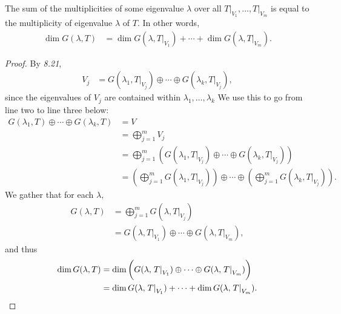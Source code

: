 \documentclass{amsart}
\newcommand{\restrict}[2]{\left.#1\right|_{#2}}
\begin{document}
\begin{claim*}
The sum of the multiplicities of some eigenvalue $\lambda$ over all
$\restrict{T}{V_1},\dots,\restrict{T}{V_m}$ is equal to the
multiplicity of eigenvalue $\lambda$ of $T.$ In other words,
\begin{align*}
    \dim G(\lambda,T)
            &= \dim G(\lambda,\restrict{T}{V_1})
            +\cdots+
            \dim G(\lambda,\restrict{T}{V_m}).
\end{align*}

\end{claim*}
\begin{proof}
By \textit{8.21},
\begin{align*}
    V_j &= G(\lambda_1,\restrict{T}{V_j})\oplus\cdots\oplus G(\lambda_k,
    \restrict{T}{V_j}),
\end{align*}
since the eigenvalues of $V_j$ are contained within
$\lambda_1,\dots,\lambda_k$ We use this to go from line
two to line three below:
\begin{align*}
    G(\lambda_1,T)\oplus\cdots\oplus G(\lambda_k,T)
      &= V \\
      &= \bigoplus_{j=1}^m{V_j} \\
      &= \bigoplus_{j=1}^m{\left(
          G(\lambda_1,\restrict{T}{V_j})\oplus\cdots\oplus G(\lambda_k,
    \restrict{T}{V_j})\right)} \\
      &= \left(\bigoplus_{j=1}^{m}G(\lambda_1,\restrict{T}{V_j})\right)
      \oplus\cdots\oplus
      \left(\bigoplus_{j=1}^{m}G(\lambda_k,\restrict{T}{V_j})\right).
\end{align*}
We gather that for each $\lambda,$
\begin{align*}
    G(\lambda,T) &= \bigoplus_{j=1}^m G(\lambda,\restrict{T}{V_j}) \\
                   &= G(\lambda,\restrict{T}{V_1})\oplus
                   \cdots\oplus G(\lambda,\restrict{T}{V_m}),
\end{align*}
and thus
\begin{align*}
    \dim G(\lambda,T) &= \dim\bigg(
        G(\lambda,\restrict{T}{V_1})
        \oplus\cdots\oplus G(\lambda,\restrict{T}{V_m})
    \bigg)\\
                        &= \dim G(\lambda,\restrict{T}{V_1})
                        +\cdots+
                        \dim G(\lambda,\restrict{T}{V_m}).\qedhere
\end{align*}
\end{proof}

\vspace{\baselineskip}
\end{document}

